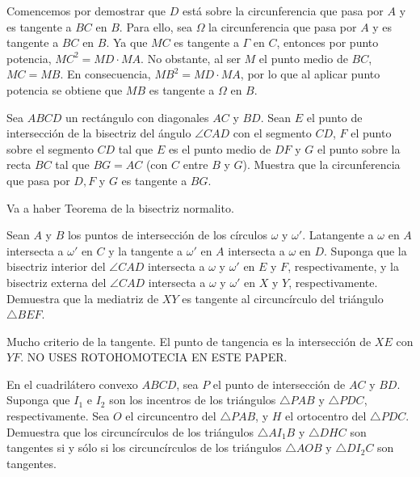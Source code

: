 \documentclass{article}
\begin{document}
\begin{solucion}
    Comencemos por demostrar que $D$ está sobre la circunferencia que 
    pasa por $A$ y es tangente a $BC$ en $B$. Para ello, sea 
    $\Omega$ la circunferencia que pasa por $A$ y es tangente a $BC$ en 
    $B$. Ya que $MC$ es tangente a $\Gamma$ en $C$, entonces por punto
    potencia, $MC^2 = MD \cdot MA$. No obstante, al ser $M$ el punto 
    medio de $BC$, $MC = MB$. En consecuencia, $MB^2 = MD \cdot MA$,
    por lo que al aplicar punto potencia se obtiene que 
    $MB$ es tangente a $\Omega$ en $B$.
\end{solucion}

\begin{ejemplo}
    Sea $ABCD$ un rectángulo con diagonales $AC$ y $BD$. Sean $E$ el punto de intersección de la bisectriz del ángulo $\angle CAD$ con el segmento $CD$, $F$ el punto sobre el segmento $CD$ tal que $E$ es el punto medio de $DF$ y $G$ el punto sobre la recta $BC$ tal que $BG = AC$ (con $C$ entre $B$ y $G$).
    Muestra que la circunferencia que pasa por $D, F$ y $G$ es tangente a $BG$.
\end{ejemplo}

\begin{solucion}
    Va a haber Teorema de la bisectriz normalito.
\end{solucion}

\begin{ejemplo}
    Sean $A$ y $B$ los puntos de intersección de los círculos $\omega$ y
    $\omega'$. Latangente a $\omega$ en $A$ intersecta a $\omega'$ en $C$
    y la tangente a $\omega'$ en $A$ intersecta a $\omega$ en $D$. Suponga
    que la bisectriz interior del $\angle CAD$ intersecta a $\omega$ y 
    $\omega'$ en $E$ y $F$, respectivamente, y la bisectriz externa del 
    $\angle CAD$ intersecta a $\omega$ y $\omega'$ en $X$ y $Y$, 
    respectivamente. Demuestra que la mediatriz de $XY$ es tangente al 
    circuncírculo del triángulo $\triangle BEF$.
\end{ejemplo}

\begin{solucion}
    Mucho criterio de la tangente. El punto de tangencia es la intersección
    de $XE$ con $YF$. NO USES ROTOHOMOTECIA EN ESTE PAPER.
\end{solucion}

\begin{ejemplo}
    En el cuadrilátero convexo $ABCD$, sea $P$ el punto de intersección de
    $AC$ y $BD$. Suponga que $I_1$ e $I_2$ son los incentros de los 
    triángulos $\triangle PAB$ y $\triangle PDC$, respectivamente. Sea $O$
    el circuncentro del $\triangle PAB$, y $H$ el ortocentro del 
    $\triangle PDC$. Demuestra que los circuncírculos de los triángulos 
    $\triangle AI_1B$ y $\triangle DHC$ son tangentes si y sólo si los 
    circuncírculos de los triángulos $\triangle AOB$ y $\triangle DI_2C$
    son tangentes.
\end{ejemplo}
\end{document}

